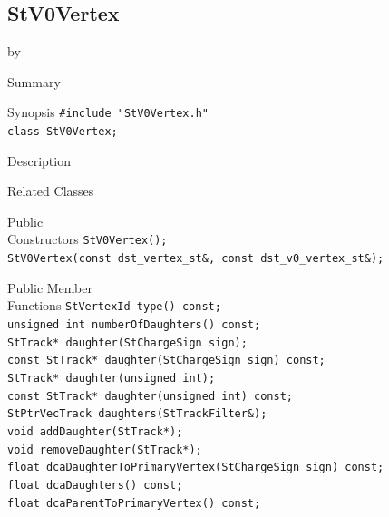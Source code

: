 \documentclass[twoside]{article}
\newcommand{\entrylabel}[1]{\mbox{\textbf{{#1}}}\hfil}%
\newenvironment{entry}
{\begin{list}{}%
    {\renewcommand{\makelabel}{\entrylabel}%
     \setlength{\labelwidth}{90pt}%
     \setlength{\leftmargin}{\labelwidth}
     \advance\leftmargin by \labelsep%
      }%
    }%
  {\end{list}}
\newcommand{\Entrylabel}[1]%
{\raisebox{0pt}[1ex][0pt]{\makebox[\labelwidth][l]%
    {\parbox[t]{\labelwidth}{\hspace{0pt}\textbf{{#1}}}}}}
\newenvironment{Entry}%
{\renewcommand{\entrylabel}{\Entrylabel}\begin{entry}}%
  {\end{entry}}
\begin{document}
\subsection{StV0Vertex}
\label{sec:StV0Vertex}
\begin{Entry}
\item[Summary]
\item[Synopsis]
    \verb+#include "StV0Vertex.h"+\\
    \verb+class StV0Vertex;+\\
\item[Description]
\item[Related Classes]
\item[Public\\ Constructors]
    \verb+StV0Vertex();+\\
    \verb+StV0Vertex(const dst_vertex_st&, const dst_v0_vertex_st&);+\\
\item[Public Member\\ Functions]
    \verb+StVertexId type() const;+\\
    
    \verb+unsigned int numberOfDaughters() const;+\\

    \verb+StTrack* daughter(StChargeSign sign);+\\

    \verb+const StTrack* daughter(StChargeSign sign) const;+\\

    \verb+StTrack* daughter(unsigned int);+\\

    \verb+const StTrack* daughter(unsigned int) const;+\\

    \verb+StPtrVecTrack daughters(StTrackFilter&);+\\

    \verb+void addDaughter(StTrack*);+\\

    \verb+void removeDaughter(StTrack*);+\\

    \verb+float dcaDaughterToPrimaryVertex(StChargeSign sign) const;+\\

    \verb+float dcaDaughters() const;+\\

    \verb+float dcaParentToPrimaryVertex() const;+\\


\end{Entry}
\end{document}
